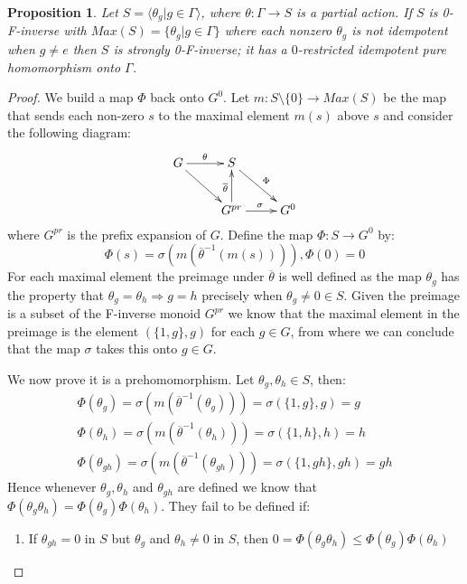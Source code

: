 \documentclass[11pt,a4paper]{amsart}
\theoremstyle{plain}
\newtheorem{proposition}[theorem]{Proposition}%
\theoremstyle{definition}%
\theoremstyle{remark}%
\begin{document}
\begin{proposition}\label{Prop:Strongly}
Let $S = \langle \theta_{g} | g \in \Gamma \rangle$, where $\theta: \Gamma \rightarrow S$ is a partial action. If $S$ is 0-F-inverse with $Max(S) = \lbrace \theta_{g} | g \in \Gamma \rbrace$ where each nonzero $\theta_{g}$ is not idempotent when $g \not = e$ then $S$ is strongly 0-F-inverse; it has a $0$-restricted idempotent pure homomorphism onto $\Gamma$.
\end{proposition}
\begin{proof}
We build a map $\Phi$ back onto $G^{0}$. Let $m: S\setminus \lbrace 0 \rbrace \rightarrow Max(S)$ be the map that sends each non-zero $s$ to the maximal element $m(s)$ above $s$ and consider the following diagram:
\begin{equation*}
\xymatrix{
G\ar@{->}[r]^{\theta}\ar@{->}[dr]^{}  & S\ar@{->}[dr]^{\Phi}  & \\
  & G^{pr} \ar@{->}[r]^{\sigma}\ar@{->}[u]^{\overline{\theta}}  & G^{0}
}
\end{equation*}
where $G^{pr}$ is the prefix expansion of $G$. Define the map $\Phi:S \rightarrow G^{0}$ by:
\begin{equation*}
\Phi(s)=\sigma ( m ( \overline{\theta}^{-1} (m(s)))), \Phi(0)=0
\end{equation*}
For each maximal element the preimage under $\overline{\theta}$ is well defined as the map $\theta_{g}$ has the property that $\theta_{g}=\theta_{h} \Rightarrow g=h$ precisely when $\theta_{g} \not = 0 \in S$. Given the preimage is a subset of the F-inverse monoid $G^{pr}$ we know that the maximal element in the preimage is the element $(\lbrace 1,g \rbrace,g)$ for each $g \in G$, from where we can conclude that the map $\sigma$ takes this onto $g \in G$.

We now prove it is a prehomomorphism. Let $\theta_{g},\theta_{h} \in S$, then:
\begin{eqnarray*}
\Phi(\theta_{g})=\sigma ( m(\overline{\theta}^{-1}(\theta_{g}))) = \sigma ( \lbrace 1,g \rbrace, g)= g\\
\Phi(\theta_{h})=\sigma ( m(\overline{\theta}^{-1}(\theta_{h}))) = \sigma ( \lbrace 1,h \rbrace, h)= h\\
\Phi(\theta_{gh})=\sigma ( m(\overline{\theta}^{-1}(\theta_{gh}))) = \sigma ( \lbrace 1,gh \rbrace, gh)= gh
\end{eqnarray*}
Hence whenever $\theta_{g},\theta_{h}$ and $\theta_{gh}$ are defined we know that $\Phi(\theta_{g}\theta_{h})=\Phi(\theta_{g})\Phi(\theta_{h})$. They fail to be defined if:
\begin{enumerate}
\item If $\theta_{gh} = 0$ in $S$ but $\theta_{g}$ and $\theta_{h} \not = 0$ in $S$, then $0=\Phi(\theta_{g}\theta_{h})\leq \Phi(\theta_{g})\Phi(\theta_{h})$


\end{enumerate}
\end{proof}
\end{document}
